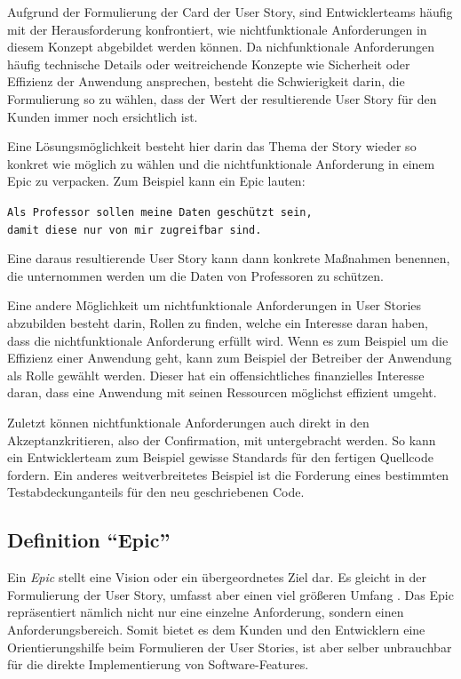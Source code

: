 \documentclass[acmtog]{acmart}
\begin{document}
Aufgrund der Formulierung der Card der User Story, sind Entwicklerteams häufig mit der Herausforderung konfrontiert, wie nichtfunktionale Anforderungen in diesem Konzept abgebildet werden können.
Da nichfunktionale Anforderungen häufig technische Details oder weitreichende Konzepte wie Sicherheit oder Effizienz der Anwendung ansprechen,
besteht die Schwierigkeit darin, die Formulierung so zu wählen, dass der Wert der resultierende User Story für den Kunden immer noch ersichtlich ist.

Eine Lösungsmöglichkeit besteht hier darin das Thema der Story wieder so konkret wie möglich zu wählen und die nichtfunktionale Anforderung in einem
Epic zu verpacken. Zum Beispiel kann ein Epic lauten:

\vspace{1em}
\texttt{Als Professor sollen meine Daten geschützt sein, \\
	\hspace*{5.5em} damit diese nur von mir zugreifbar sind.}
\vspace{1em}

Eine daraus resultierende User Story kann dann konkrete Maßnahmen benennen, die unternommen werden um die Daten von Professoren zu schützen.

Eine andere Möglichkeit um nichtfunktionale Anforderungen in User Stories abzubilden besteht darin, Rollen zu finden, welche ein Interesse daran haben,
dass die nichtfunktionale Anforderung erfüllt wird. Wenn es zum Beispiel um die Effizienz einer Anwendung geht, kann zum Beispiel der Betreiber der
Anwendung als Rolle gewählt werden. Dieser hat ein offensichtliches finanzielles Interesse daran, dass eine Anwendung mit seinen Ressourcen möglichst effizient
umgeht.

Zuletzt können nichtfunktionale Anforderungen auch direkt in den Akzeptanzkritieren, also der Confirmation, mit untergebracht werden.
So kann ein Entwicklerteam zum Beispiel gewisse Standards für den fertigen Quellcode fordern.
Ein anderes weitverbreitetes Beispiel ist die Forderung eines bestimmten Testabdeckunganteils für den neu geschriebenen Code.

\subsection{Definition ``Epic''}
Ein \emph{Epic} stellt eine Vision oder ein übergeordnetes Ziel dar.
Es gleicht in der Formulierung der User Story, umfasst aber einen viel größeren Umfang \cite[pp. 6, 14]{cohn_user_2004}.
Das Epic repräsentiert nämlich nicht nur eine einzelne Anforderung, sondern einen Anforderungsbereich.
Somit bietet es dem Kunden und den Entwicklern eine Orientierungshilfe beim Formulieren der User Stories,
ist aber selber unbrauchbar für die direkte Implementierung von Software-Features.
\end{document}
